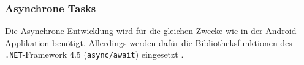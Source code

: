 \documentclass[Bachelorarbeit.tex]{subfiles}
\begin{document}
\subsubsection*{Asynchrone Tasks}
Die Asynchrone Entwicklung wird für die gleichen Zwecke wie in der Android-Applikation benötigt. 
Allerdings  werden dafür die Bibliotheksfunktionen des \texttt{.NET}-Framework 4.5 (\texttt{async/await}) eingesetzt \parencite[vgl.:][]{wp8_async}.\\

\end{document}
